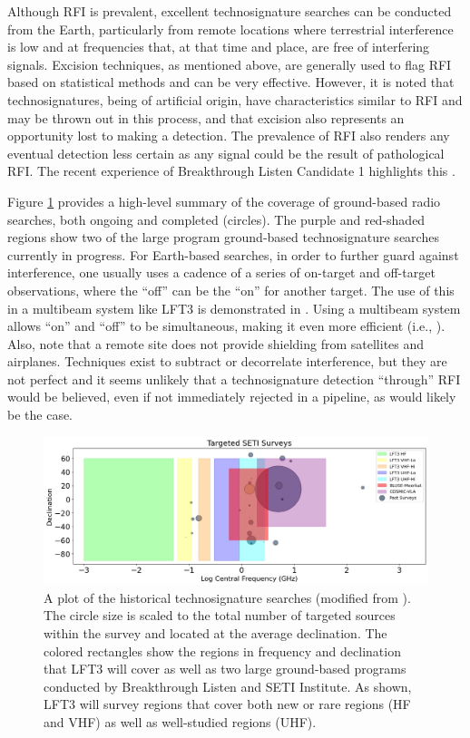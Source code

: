 Although RFI is prevalent, excellent technosignature searches can be conducted from the Earth, particularly from remote locations where terrestrial interference is low and at frequencies that, at that time and place, are free of interfering signals. Excision techniques, as mentioned above, are generally used to flag RFI based on statistical methods and can be very effective.  However, it is noted that technosignatures, being of artificial origin, have characteristics similar to RFI and may be thrown out in this process, and that excision also represents an opportunity lost to making a detection.  The prevalence of RFI also renders any eventual detection less certain as any signal could be the result of pathological RFI.  The recent experience of Breakthrough Listen Candidate 1 highlights this \citep{2021NatAs...5.1153S}.

Figure \ref{fig:bubbles} provides a high-level summary of the coverage of ground-based radio searches, both ongoing and completed (circles). The purple and red-shaded regions show two of the large program ground-based technosignature searches currently in progress. For Earth-based searches, in order to further guard against interference, one usually uses a cadence of a series of on-target and off-target observations, where the ``off'' can be the ``on'' for another target. The use of this in a multibeam system like LFT3 is demonstrated in \cite{Huang_2023}. Using a multibeam system allows ``on'' and ``off'' to be simultaneous, making it even more efficient (i.e., \citealt{multibeam}). Also, note that a remote site does not provide shielding from satellites and airplanes. Techniques exist to subtract or decorrelate interference, but they are not perfect and it seems unlikely that a technosignature detection ``through'' RFI would be believed, even if not immediately rejected in a pipeline, as would likely be the case.




\begin{figure}
    \centering
    \includegraphics[width=0.85\linewidth]{figures/SETI_Bubble_LFT3.jpg}
    \caption{A plot of the historical technosignature searches (modified from \citealt{Tremblay_2022}). The circle size is scaled to the total number of targeted sources within the survey and located at the average declination. The colored rectangles show the regions in frequency and declination that LFT3 will cover as well as two large ground-based programs conducted by Breakthrough Listen and SETI Institute. As shown, LFT3 will survey regions that cover both new or rare regions (HF and VHF) as well as well-studied regions (UHF).}
    \label{fig:bubbles}
\end{figure}

